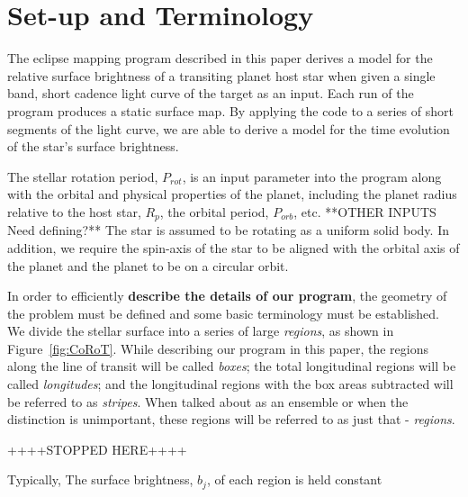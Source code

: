 









\section{Set-up and Terminology \label{terminology}}
The eclipse mapping program described in this paper derives a model for the relative surface brightness of a transiting planet host star when given a single band, short cadence light curve of the target as an input.  Each run of the program produces a static surface map. By applying the code to a series of short segments of the light curve, we are able to derive a model for the time evolution of the star's surface brightness.  

The stellar rotation period, $P_{rot}$, is an input parameter into the program along with the orbital and physical properties of the planet, including the
planet radius relative to the host star, $R_{p}$, the orbital period, $P_{orb}$, etc.   **OTHER INPUTS Need defining?**
The star is assumed to be rotating as a uniform solid body.  In addition, we require the spin-axis of the star   
to be aligned with the orbital axis of the planet and the planet to be on a circular orbit.  

In order to efficiently {\bf describe the details of our program}, the geometry
of the problem must be defined and some basic terminology must be established.
We divide the stellar surface into a series of large {\it regions}, as shown in Figure~\ref{fig:CoRoT}.  
While describing our program in this paper, the regions along the line of transit will be called {\it boxes}; 
the total longitudinal regions will be called {\it longitudes};
and the longitudinal regions with the box areas subtracted will be referred to as {\it stripes}.
When talked about as an ensemble or when the distinction is unimportant, these regions will be referred to as just that - {\it regions}. 

++++STOPPED HERE++++

Typically, 
The surface brightness, $b_j$, of
each region is held constant 

